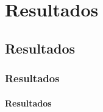 

\chapter{Resultados}\label{cap:Resultados}

\section{Resultados}

\subsection{Resultados}

\subsubsection[]{Resultados}
